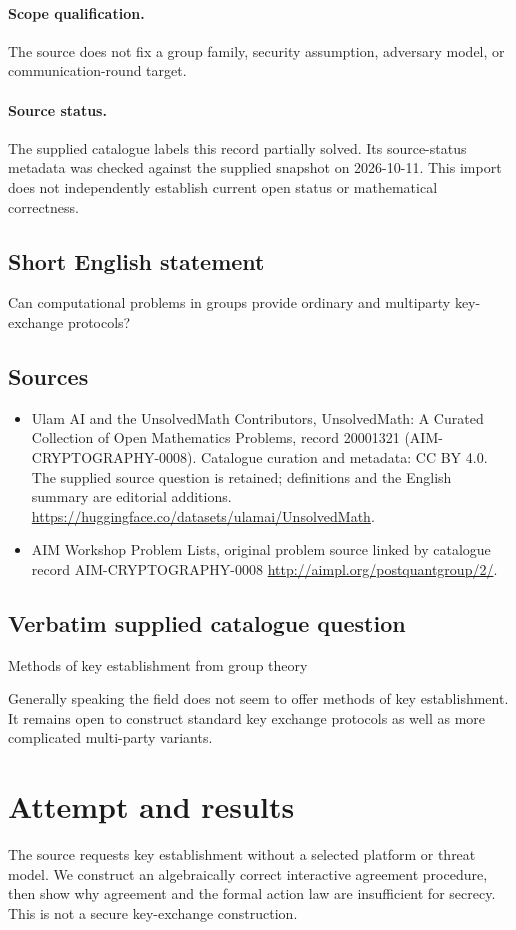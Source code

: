\documentclass[11pt]{article}
\begin{document}
\paragraph{Scope qualification.}
The source does not fix a group family, security assumption, adversary model, or communication-round target.
\paragraph{Source status.}
The supplied catalogue labels this record partially solved. Its source-status metadata was checked against the supplied snapshot on 2026-10-11. This import does not independently establish current open status or mathematical correctness.
\subsection{Short English statement}
Can computational problems in groups provide ordinary and multiparty key-exchange protocols?
\subsection{Sources}
\begin{itemize}
\item[S1] Ulam AI and the UnsolvedMath Contributors, UnsolvedMath: A Curated Collection of Open Mathematics Problems, record 20001321 (AIM-CRYPTOGRAPHY-0008). Catalogue curation and metadata: CC BY 4.0. The supplied source question is retained; definitions and the English summary are editorial additions.
\url{https://huggingface.co/datasets/ulamai/UnsolvedMath}.
\item[S2] AIM Workshop Problem Lists, original problem source linked by catalogue record AIM-CRYPTOGRAPHY-0008
\url{http://aimpl.org/postquantgroup/2/}.
\end{itemize}
\subsection{Verbatim supplied catalogue question}
Methods of key establishment from group theory

Generally speaking the field does not seem to offer methods of key establishment. It remains open to construct standard key exchange protocols as well as more complicated multi-party variants.

\section{Attempt and results}
The source requests key establishment without a selected platform or threat
model. We construct an algebraically correct interactive agreement procedure,
then show why agreement and the formal action law are insufficient for secrecy.
This is not a secure key-exchange construction.
\end{document}
